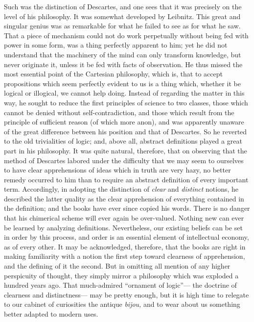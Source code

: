 \documentclass[]{article}
\begin{document}
Such was the distinction of Descartes, and one sees that it was precisely on the level of his philosophy. It was somewhat developed by Leibnitz. This great and singular genius was as remarkable for what he failed to see as for what he saw. That a piece of mechanism could not do work perpetually without being fed with power in some form, was a thing perfectly apparent to him; yet he did not understand that the machinery of the mind can only transform knowledge, but never originate it, unless it be fed with facts of observation. He thus missed the most essential point of the Cartesian philosophy, which is, that to accept propositions which seem perfectly evident to us is a thing which, whether it be logical or illogical, we cannot help doing. Instead of regarding the matter in this way, he sought to reduce the first principles of science to two classes, those which cannot be denied without self-contradiction, and those which result from the principle of sufficient reason (of which more anon), and was apparently unaware of the great difference between his position and that of Descartes. So he reverted to the old trivialities of logic; and, above all, abstract definitions played a great part in his philosophy. It was quite natural, therefore, that on observing that the method of Descartes labored under the difficulty that we may seem to ourselves to have clear apprehensions of ideas which in truth are very hazy, no better remedy occurred to him than to require an abstract definition of every important term. Accordingly, in adopting the distinction of \emph{clear} and \emph{distinct} notions, he described the latter quality as the clear apprehension of everything contained in the definition; and the books have ever since copied his words. There is no danger that his chimerical scheme will ever again be over-valued. Nothing new can ever be learned by analyzing definitions. Nevertheless, our existing  beliefs can be set in order by this process, and order is an essential element of intellectual economy, as of every other. It may be acknowledged, therefore, that the books are right in making familiarity with a notion the first step toward clearness of apprehension, and the defining of it the second. But in omitting all mention of any higher perspicuity of thought, they simply mirror a philosophy which was exploded a hundred years ago. That much-admired ``ornament of logic''--- the doctrine of clearness and distinctness--- may be pretty enough, but it is high time to relegate to our cabinet of curiosities the antique \emph{bijou,} and to wear about us something better adapted to modern uses.
\end{document}

